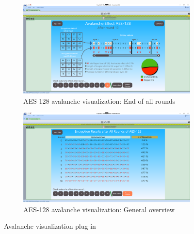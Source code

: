 \begin{figure}
\centering
\begin{subfigure}{\textwidth}
  \centering
  \includegraphics[width=\textwidth]{figures/ct2/avalanche.png}
  \caption{AES-128 avalanche visualization: End of all rounds}
  \label{fig:avalanche.roundsend}
\end{subfigure}
\begin{subfigure}{\textwidth}
  \centering
  \includegraphics[width=\textwidth]{figures/ct2/avalanche2.png}
  \caption{AES-128 avalanche visualization: General overview}
  \label{fig:avalanche.overview}
\end{subfigure}
\caption{Avalanche visualization plug-in}
\label{fig:avalanche}
\end{figure}

